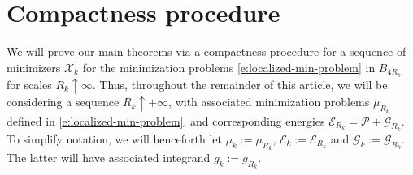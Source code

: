 \documentclass[10pt,reqno]{amsart}
\numberwithin{equation}{section}
\theoremstyle{definition}
\newcommand{\Ecal}{\mathcal{E}}
\newcommand{\Pcal}{\mathcal{P}}
\newcommand{\osc}{\mathrm{osc}}
\newcommand{\cG}{\mathcal{G}}
\DeclareMathOperator{\Lip}{Lip}
\newcommand{\X}{\mathcal{X}}
\begin{document}
{%



\section{Compactness procedure}\label{s:compactness}
We will prove our main theorems via a compactness procedure for a sequence of minimizers $\X_k$ for the minimization problems \eqref{e:localized-min-problem} in $B_{4R_k}$ for scales $R_k \uparrow \infty$. Thus, throughout the remainder of this article, we will be considering a sequence $R_k \uparrow +\infty$, with associated minimization problems $\mu_{R_k}$ defined in \eqref{e:localized-min-problem}, and corresponding energies $\Ecal_{R_k}= \Pcal + \cG_{R_k}$. To simplify notation, we will henceforth let $\mu_k := \mu_{R_k}$, $\Ecal_k := \Ecal_{R_k}$ and $\cG_k := \cG_{R_k}$. The latter will have associated integrand $g_k := g_{R_k}$.

}
\end{document}
